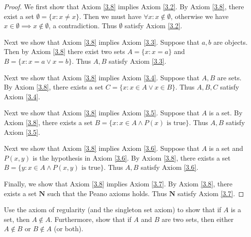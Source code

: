 \begin{proof}
    We first show that Axiom \ref{3.8} implies Axiom \ref{3.2}.
    By Axiom \ref{3.8}, there exist a set \(\emptyset = \{x: x \neq x\}\).
    Then we must have \(\forall x : x \notin \emptyset\), otherwise we have \(x \in \emptyset \implies x \notin \emptyset\), a contradiction.
    Thus \(\emptyset\) satisfy Axiom \ref{3.2}.

    Next we show that Axiom \ref{3.8} implies Axiom \ref{3.3}.
    Suppose that \(a, b\) are objects.
    Then by Axiom \ref{3.8} there exist two sets \(A = \{x: x = a\}\) and \(B = \{x: x = a \lor x = b\}\).
    Thus \(A, B\) satisfy Axiom \ref{3.3}.

    Next we show that Axiom \ref{3.8} implies Axiom \ref{3.4}.
    Suppose that \(A, B\) are sets.
    By Axiom \ref{3.8}, there exists a set \(C = \{x : x \in A \lor x \in B\}\).
    Thus \(A, B, C\) satisfy Axiom \ref{3.4}.

    Next we show that Axiom \ref{3.8} implies Axiom \ref{3.5}.
    Suppose that \(A\) is a set.
    By Axiom \ref{3.8}, there exists a set \(B = \{x : x \in A \land P(x) \text{ is true}\}\).
    Thus \(A, B\) satisfy Axiom \ref{3.5}.

    Next we show that Axiom \ref{3.8} implies Axiom \ref{3.6}.
    Suppose that \(A\) is a set and \(P(x, y)\) is the hypothesis in Axiom \ref{3.6}.
    By Axiom \ref{3.8}, there exists a set \(B = \{y :  x \in A \land P(x, y) \text{ is true}\}\).
    Thus \(A, B\) satisfy Axiom \ref{3.6}.

    Finally, we show that Axiom \ref{3.8} implies Axiom \ref{3.7}.
    By Axiom \ref{3.8}, there exists a set \(\mathbf{N}\) such that the Peano axioms holds.
    Thus \(\mathbf{N}\) satisfy Axiom \ref{3.7}.
\end{proof}

\begin{exercise}\label{ex 3.2.2}
    Use the axiom of regularity (and the singleton set axiom) to show that if \(A\) is a set, then \(A \notin A\).
    Furthermore, show that if \(A\) and \(B\) are two sets, then either \(A \notin B\) or \(B \notin A\) (or both).
\end{exercise}

